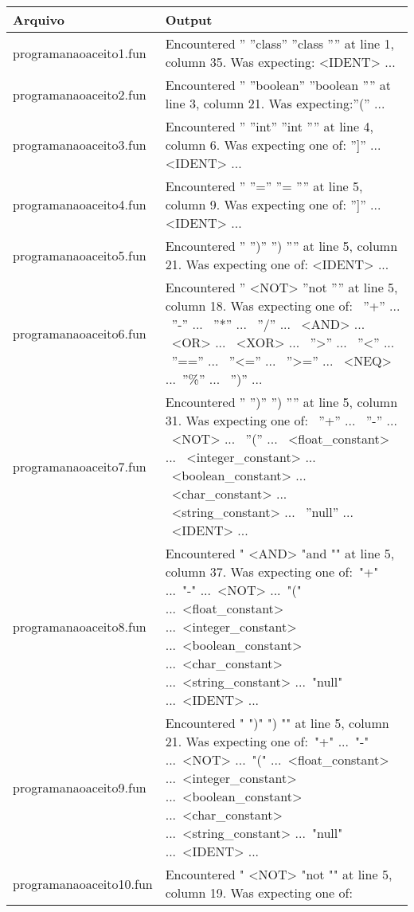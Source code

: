 \documentclass[
	article,			%
	11pt,				%
	oneside,			%
	a4paper,			%
	portuguese,			%
	brazil,				%
	sumario=tradicional
	]{abntex2}
\begin{document}
\begin{center}
\begin{table}[H]
\begin{tabularx}{1\textwidth}{p{5cm}|X}
Arquivo & Output \\
\hline
programanaoaceito1.fun & Encountered '' ''class'' ''class '''' at line 1, column 35. Was expecting: <IDENT> ... \\
programanaoaceito2.fun & Encountered '' ''boolean'' ''boolean '''' at line 3, column 21. Was expecting:''('' ... \\
programanaoaceito3.fun &  Encountered '' ''int'' ''int '''' at line 4, column 6. Was expecting one of: '']'' ... <IDENT> ... \\
programanaoaceito4.fun &  Encountered '' ''='' ''= '''' at line 5, column 9. Was expecting one of: '']'' ... <IDENT> ...\\
programanaoaceito5.fun &  Encountered '' '')'' '') '''' at line 5, column 21. Was expecting one of: <IDENT> ...\\
programanaoaceito6.fun &  Encountered '' <NOT> ''not '''' at line 5, column 18. Was expecting one of: \
    ''+'' ... \
    ''-'' ... \
    ''*'' ... \
    ''/'' ... \
    <AND> ... \
    <OR> ... \ 
    <XOR> ... \ 
    ''>'' ... \ 
    ''<'' ... \
    ''=='' ... \ 
    ''<='' ... \ 
    ''>='' ... \ 
    <NEQ> ...\ 
    ''\%'' ... \
    '')'' ...\\
programanaoaceito7.fun & Encountered '' '')'' '') '''' at line 5, column 31. Was expecting one of: \
    ''+'' ... \
    ''-'' ... \
    <NOT> ... \
    ''('' ... \
    <float\_constant> ... \
    <integer\_constant> ... \
    <boolean\_constant> ... \
    <char\_constant> ... \
    <string\_constant> ... \
    ''null'' ... \
    <IDENT> ... \\
programanaoaceito8.fun & Encountered " <AND> "and "" at line 5, column 37. Was expecting one of:\
    "+" ...\
    "-" ...\
    <NOT> ...\
    "(" ...\
    <float\_constant> ...\
    <integer\_constant> ...\
    <boolean\_constant> ...\
    <char\_constant> ...\
    <string\_constant> ...\
    "null" ...\
    <IDENT> ... \\
programanaoaceito9.fun & Encountered " ")" ") "" at line 5, column 21. Was expecting one of:\
    "+" ...\
    "-" ...\
    <NOT> ...\
    "(" ...\
    <float\_constant> ...\
    <integer\_constant> ...\
    <boolean\_constant> ...\
    <char\_constant> ...\
    <string\_constant> ...\
    "null" ...\
    <IDENT> ...\\
programanaoaceito10.fun & Encountered " <NOT> "not "" at line 5, column 19. Was expecting one of:\

\end{tabularx}
\end{table}
\end{center}
\end{document}
